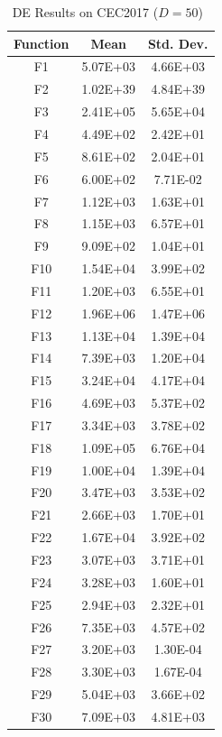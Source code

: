 \documentclass[11pt]{article}
\begin{document}
\begin{table}[htbp]
\centering
\caption{DE Results on CEC2017 ($D=50$)~\cite{mousavirad2021clude}}
\label{tab:de_cec2017_d50}
\small
\begin{tabular}{@{}ccc@{}}
\toprule
\textbf{Function} & \textbf{Mean} & \textbf{Std. Dev.} \\
\midrule
F1  & 5.07E+03 & 4.66E+03 \\
F2  & 1.02E+39 & 4.84E+39 \\
F3  & 2.41E+05 & 5.65E+04 \\
F4  & 4.49E+02 & 2.42E+01 \\
F5  & 8.61E+02 & 2.04E+01 \\
F6  & 6.00E+02 & 7.71E-02 \\
F7  & 1.12E+03 & 1.63E+01 \\
F8  & 1.15E+03 & 6.57E+01 \\
F9  & 9.09E+02 & 1.04E+01 \\
F10 & 1.54E+04 & 3.99E+02 \\
F11 & 1.20E+03 & 6.55E+01 \\
F12 & 1.96E+06 & 1.47E+06 \\
F13 & 1.13E+04 & 1.39E+04 \\
F14 & 7.39E+03 & 1.20E+04 \\
F15 & 3.24E+04 & 4.17E+04 \\
F16 & 4.69E+03 & 5.37E+02 \\
F17 & 3.34E+03 & 3.78E+02 \\
F18 & 1.09E+05 & 6.76E+04 \\
F19 & 1.00E+04 & 1.39E+04 \\
F20 & 3.47E+03 & 3.53E+02 \\
F21 & 2.66E+03 & 1.70E+01 \\
F22 & 1.67E+04 & 3.92E+02 \\
F23 & 3.07E+03 & 3.71E+01 \\
F24 & 3.28E+03 & 1.60E+01 \\
F25 & 2.94E+03 & 2.32E+01 \\
F26 & 7.35E+03 & 4.57E+02 \\
F27 & 3.20E+03 & 1.30E-04 \\
F28 & 3.30E+03 & 1.67E-04 \\
F29 & 5.04E+03 & 3.66E+02 \\
F30 & 7.09E+03 & 4.81E+03 \\
\bottomrule
\end{tabular}
\end{table}
\end{document}
